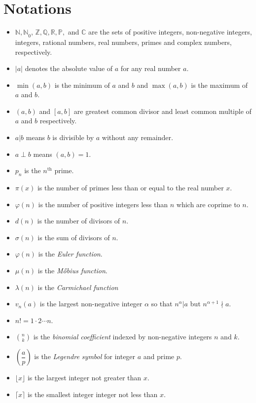 \documentclass{subfile}
\begin{document}
	\section*{Notations}
		\begin{itemize}
			\item $\mathbb{N,N}_0$, $\mathbb{Z, Q, R, P},$ and $\mathbb{C}$ are the sets of positive integers, non-negative integers, integers, rational numbers, real numbers, primes and complex numbers, respectively.
			\item $|a|$ denotes the absolute value of $a$ for any real number $a$.
			\item $\min(a,b)$ is the minimum of $a$ and $b$ and $\max(a,b)$ is the maximum of $a$ and $b$.
			\item $(a,b)$ and $[a,b]$ are greatest common divisor and least common multiple of $a$ and $b$ respectively.
			\item $a|b$ means $b$ is divisible by $a$ without any remainder.
			\item $a\perp b$ means $(a,b)=1$.
			\item $p_n$ is the $n^{\text{th}}$ prime.
			\item $\pi(x)$ is the number of primes less than or equal to the real number $x$.		
			\item $\varphi(n)$ is the number of positive integers less than $n$ which are coprime to $n$.
			\item $d(n)$ is the number of divisors of $n$.
			\item $\sigma(n)$ is the sum of divisors of $n$.
			\item $\varphi(n)$ is the {\it Euler function}.
			\item $\mu(n)$ is the {\it M\H{o}bius function}.
			\item $\lambda(n)$ is the {\it Carmichael function}
			\item $v_n(a)$ is the largest non-negative integer $\alpha$ so that $n^\alpha|a$ but $n^{\alpha+1}\nmid a$.
			\item $n!=1\cdot2\cdots n$.
			\item $\displaystyle \binom{n}{k}$ is the \textit{binomial coefficient} indexed by non-negative integers $n$ and $k$.
			\item $\left(\dfrac{a}{p}\right)$ is the \textit{Legendre symbol} for integer $a$ and prime $p$.
			\item $\lfloor x \rfloor$ is the  largest integer not greater than $x$.
			\item $\lceil x \rceil$ is the smallest integer integer not less than $x$.
		\end{itemize}
	
		\newpage
\end{document}

